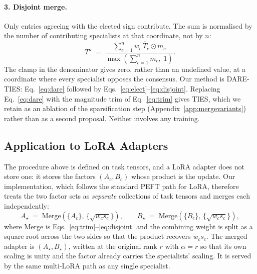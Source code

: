 \paragraph{3. Disjoint merge.} Only entries agreeing with the elected sign contribute. The sum is
normalised by the number of contributing specialists at that coordinate, not by $n$:
%
\begin{equation}
T^{\star} \;=\; \frac{\sum_{c=1}^{n} w_c\, \widehat{T}_c \odot m_c}{\max\!\left(\sum_{c=1}^{n} m_c,\; 1\right)} .
\label{eq:disjoint}
\end{equation}
%
The clamp in the denominator gives zero, rather than an undefined value, at a coordinate where every
specialist opposes the consensus. Our method is \textsc{DARE-TIES}: Eq.~\ref{eq:dare} followed by
Eqs.~\ref{eq:elect}--\ref{eq:disjoint}. Replacing Eq.~\ref{eq:dare} with the magnitude trim of
Eq.~\ref{eq:trim} gives \textsc{TIES}, which we retain as an ablation of the sparsification step
(Appendix~\ref{app:mergevariants}) rather than as a second proposal. Neither involves any training.

\subsection{Application to LoRA Adapters}
\label{sec:factorspace}
The procedure above is defined on task tensors, and a LoRA adapter does not store one: it stores the
factors $(A_c, B_c)$ whose product is the update. Our implementation, which follows the standard
PEFT path for LoRA, therefore treats the two factor sets as \emph{separate} collections of task
tensors and merges each independently:
%
\begin{equation}
A_{\star} \;=\; \mathrm{Merge}\!\left(\{A_c\},\,\{\sqrt{w_c s_c}\}\right),
\qquad
B_{\star} \;=\; \mathrm{Merge}\!\left(\{B_c\},\,\{\sqrt{w_c s_c}\}\right),
\label{eq:factormerge}
\end{equation}
%
where $\mathrm{Merge}$ is Eqs.~\ref{eq:trim}--\ref{eq:disjoint} and the combining weight is split as a
square root across the two sides so that the product recovers $w_c s_c$. The merged adapter is
$(A_{\star}, B_{\star})$, written at the original rank $r$ with $\alpha = r$ so that its own scaling
is unity and the factor already carries the specialists' scaling. It is served by the same multi-LoRA
path as any single specialist.

